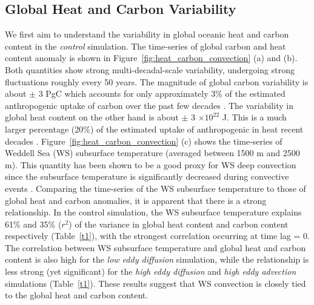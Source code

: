\subsection{Global Heat and Carbon Variability}
We first aim to understand the variability in global oceanic heat and carbon
content in the \textit{control} simulation. The time-series of global carbon and
heat content anomaly is shown in Figure~\ref{fig:heat_carbon_convection} (a) and
(b). Both quantities show strong multi-decadal-scale variability, undergoing
strong fluctuations roughly every 50 years. The magnitude of global
carbon variability is about $\pm$ 3 PgC which accounts for only approximately
3\% of the estimated anthropogenic uptake of carbon over the past few decades
\citep{Khatiwala2012,Sabine2004,Waugh2006}. The variability in global heat
content on the other hand is about $\pm$ 3 $\times 10^{22}$ J. This is a much
larger percentage (20\%) of the estimated uptake of anthropogenic in heat recent
decades \citep{Levitus2009}. Figure~\ref{fig:heat_carbon_convection}
(c) shows the time-series of Weddell Sea (WS)
subsurface temperature (averaged between 1500 m and 2500 m). This quantity has
been shown to be a good proxy for WS deep convection since the subsurface
temperature is significantly decreased during convective events \citep{Bernardello2014}.
Comparing the time-series of the WS subsurface temperature to those of
global heat and carbon anomalies, it is apparent that there is a strong
relationship. In the control simulation, the WS subsurface temperature explains
61\% and 35\% ($r^2$) of the variance in global heat content and carbon content
respectively (Table~\ref{t1}), with the strongest correlation occurring at time
lag = 0. The correlation between WS subsurface temperature and global heat and
carbon content is also high for the \textit{low eddy diffusion} simulation,
while the relationship is less strong (yet significant) for the \textit{high
eddy diffusion} and \textit{high eddy advection} simulations (Table~\ref{t1}).
These results suggest that WS convection is closely tied to the global heat and
carbon content.

